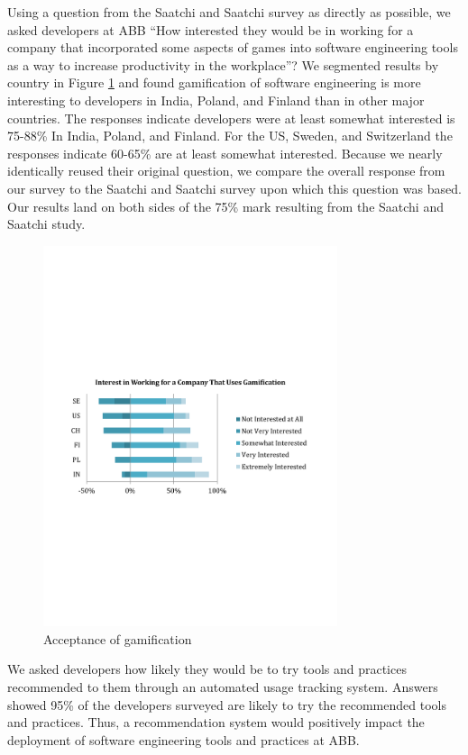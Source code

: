 \documentclass{sig-alternate}
\begin{document}
Using a question from the Saatchi and Saatchi survey \cite{wbsnipes:SaatchiGameification} as directly as possible, we asked developers at ABB ``How interested they would be in working for a company that incorporated some aspects of games into software engineering tools as a way to increase productivity in the workplace''?  We segmented results by country in Figure \ref{fig:gamification} and found gamification of software engineering is more interesting to developers in India, Poland, and Finland than in other major countries.  The responses indicate developers were at least somewhat interested is 75-88\% In India, Poland, and Finland.  For the US, Sweden, and Switzerland the responses indicate 60-65\% are at least somewhat interested.  Because we nearly identically reused their original question, we compare the overall response from our survey to the Saatchi and Saatchi survey\cite{wbsnipes:SaatchiGameification} upon which this question was based.  Our results land on both sides of the 75\% mark resulting from the Saatchi and Saatchi study.  

\begin{figure}
	\includegraphics[width=3.4in]{gamificationquestion.pdf}
	\caption{Acceptance of gamification}
	\label{fig:gamification}
\end{figure}

We asked developers how likely they would be to try tools and practices recommended to them through an automated usage tracking system.  Answers showed 95\% of the developers surveyed are likely to try the recommended tools and practices.  Thus, a recommendation system would positively impact the deployment of software engineering tools and practices at ABB.
\end{document}
